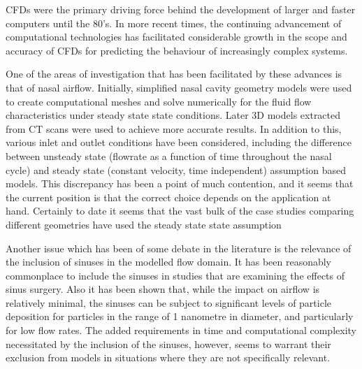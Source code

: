 CFDs were the primary driving force behind the development of larger and faster computers until the 80's\cite{Wendt2009}. In more recent times, the continuing advancement of computational technologies has facilitated considerable growth in the scope and accuracy of CFDs for predicting the behaviour of increasingly complex systems\cite{Tu2008}. 

One of the areas of investigation that has been facilitated by these advances is that of nasal airflow. Initially, simplified nasal cavity geometry models were used to create computational meshes and solve numerically for the fluid flow characteristics under steady state state conditions\cite{Keyhani1995, Hahn1993}. Later 3D models extracted from CT scans were used to achieve more accurate results\cite{Martonen2002}. In addition to this, various inlet and outlet conditions have been considered, including the difference between unsteady state  (flowrate as a function of time throughout the nasal cycle)\cite{Shi2006} and steady state (constant velocity, time independent) assumption based models\cite{Wen2008}. This discrepancy has been a point of much contention, and it seems that the current position is that the correct choice depends on the application at hand\cite{Doorly2008c}. Certainly to date it seems that the vast bulk of the case studies comparing different geometries have used the steady state state assumption\cite{Xi2012, Zhu2011, Garcia2007}

Another issue which has been of some debate in the literature is the relevance of the inclusion of sinuses in the modelled flow domain. It has been reasonably commonplace to include the sinuses in studies that are examining the effects of sinus surgery\cite{Xiong2008a, Lindemann2005}. Also it has been shown that, while the impact on airflow is relatively minimal, the sinuses can be subject to significant levels of particle deposition for particles in the range of 1 nanometre in diameter, and particularly for low flow rates\cite{Ge2012}. The added requirements in time and computational complexity necessitated by the inclusion of the sinuses, however, seems to warrant their exclusion from models in situations where they are not specifically relevant\cite{Doorly2008c}.



